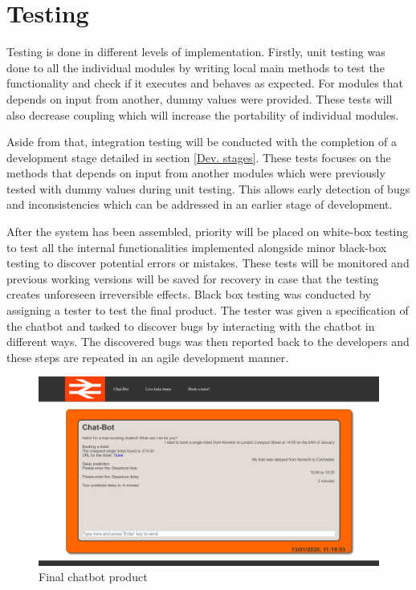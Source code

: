 \documentclass[11pt]{article}
\begin{document}
\section{Testing}
Testing is done in different levels of implementation. Firstly, unit testing was done to all the individual modules by writing local main methods to test the functionality and check if it executes and behaves as expected. For modules that depends on input from another, dummy values were provided. These tests will also decrease coupling which will increase the portability of individual modules.

Aside from that, integration testing will be conducted with the completion of a development stage detailed in section \ref{Dev. stages}. These tests focuses on the methods that depends on input from another modules which were previously tested with dummy values during unit testing. This allows early detection of bugs and inconsistencies which can be addressed in an earlier stage of development.

After the system has been assembled, priority will be placed on white-box testing to test all the internal functionalities implemented alongside minor black-box testing to discover potential errors or mistakes. These tests will be monitored and previous working versions will be saved for recovery in case that the testing creates unforeseen irreversible effects. Black box testing was conducted by assigning a tester to test the final product. The tester was given a specification of the chatbot and tasked to discover bugs by interacting with the chatbot in different ways. The discovered bugs was then reported back to the developers and these steps are repeated in an agile development manner. 

\begin{figure}[!htb]
	\centering
	\includegraphics[width=1.0\textwidth]{Final_Product}
	\caption{Final chatbot product }\label{fig:Final_Product}
\end{figure}
\end{document}
